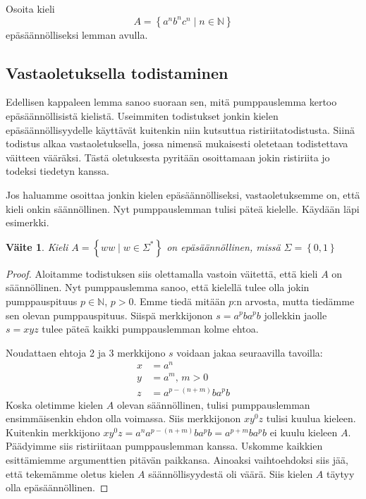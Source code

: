 \documentclass[a4paper,11pt]{article}
\newtheorem*{claim}{Väite}
\theoremstyle{definition}
\newcommand{\set}[1]{{\left\{ #1 \right\}}}
\newcommand{\Nat}{\mathbb{N}}
\begin{document}
\begin{exercise}
  Osoita kieli
  \begin{equation*}
      A = \set{a^nb^nc^n \mid n \in \Nat}
  \end{equation*}
  epäsäännölliseksi lemman avulla.
\end{exercise}

\subsection*{Vastaoletuksella todistaminen}

Edellisen kappaleen lemma sanoo suoraan sen, mitä pumppauslemma kertoo
e\-pä\-sään\-nöl\-li\-sis\-tä kielistä. Useimmiten todistukset jonkin
kielen e\-pä\-sään\-nöl\-li\-syy\-del\-le käyttävät kuitenkin niin
kutsuttua ristiriitatodistusta. Siinä todistus alkaa vastaoletuksella,
jossa nimensä mukaisesti oletetaan todistettava väitteen vääräksi.
Tästä oletuksesta pyritään osoittamaan jokin ristiriita jo todeksi
tiedetyn kanssa.

Jos haluamme osoittaa jonkin kielen epäsäännölliseksi, vastaoletuksemme on,
että kieli onkin säännöllinen. Nyt pumppauslemman tulisi päteä kielelle.
Käydään läpi esimerkki.

\begin{claim}
    Kieli $A = \set{ww \mid w \in \Sigma^*}$ on epäsäännöllinen, missä $\Sigma
    = \set{0,1}$
\end{claim}
\begin{proof}
    Aloitamme todistuksen siis olettamalla vastoin väi\-tet\-tä, että
    kieli $A$ on sään\-nöl\-li\-nen. Nyt pumppauslemma sanoo, että
    kielellä tulee olla jokin pumppauspituus $p \in \Nat$, $p > 0$.
    Emme tiedä mitään $p$:n arvosta, mutta tiedämme sen olevan
    pumppauspituus. Siispä merkkijonon $s = a^pba^pb$ jollekkin jaolle
    $s = xyz$ tulee päteä kaikki pumppauslemman kolme ehtoa.

    Noudattaen ehtoja 2 ja 3 merkkijono $s$ voidaan jakaa seuraavilla tavoilla:
    \begin{align*}
        x & = a^n \\
        y & = a^m \text{, } m > 0 \\
        z & = a^{p-(n+m)}ba^pb
    \end{align*}
    Koska oletimme kielen $A$ olevan säännöllinen, tulisi pumppauslemman
    ensimmäisenkin ehdon olla voimassa. Siis merkkijonon $xy^0z$ tulisi kuulua
    kieleen. Kuitenkin merkkijono $xy^0z = a^na^{p-(n+m)}ba^pb = a^{p+m}ba^pb$ ei
    kuulu kieleen $A$. Päädyimme siis ristiriitaan pumppauslemman kanssa.
    Uskomme kaikkien esittämiemme argumenttien pitävän paikkansa.  Ainoaksi
    vaihtoehdoksi siis jää, että tekemämme oletus kielen $A$
    sään\-nöl\-li\-syy\-des\-tä oli väärä. Siis kielen $A$ täytyy olla
    epäsäännöllinen.
\end{proof}
\end{document}

